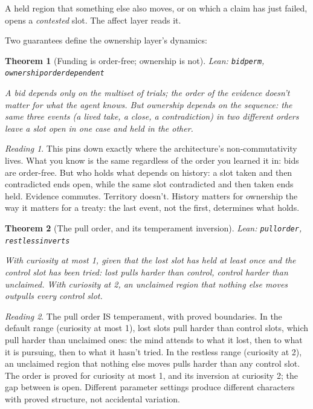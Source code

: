\documentclass[11pt]{article}
\newcommand{\leanus}{\textunderscore\allowbreak}
\newcommand{\lean}[1]{{\let\_\leanus\texttt{#1}}}
\newtheorem{theorem}{Theorem}[section]
\theoremstyle{remark}
\newtheorem*{reading}{Reading}
\begin{document}
A held region that something else also moves, or on which a claim has just failed, opens a
\emph{contested} slot. The affect layer reads it.

Two guarantees define the ownership layer's dynamics:

\begin{theorem}[Funding is order-free; ownership is not]
{\small\sloppy Lean: \lean{bid\_perm}, \lean{ownership\_order\_dependent}\par}
A bid depends only on the multiset of trials; the order of the evidence doesn't matter
for what the agent knows. But ownership depends on the sequence: the same three events
(a lived take, a close, a contradiction) in two different orders leave a slot open in one
case and held in the other.
\end{theorem}

\begin{reading}
This pins down exactly where the architecture's non-commutativity lives. What you know is
the same regardless of the order you learned it in: bids are order-free. But who holds
what depends on history: a slot taken and then contradicted ends open, while the same slot
contradicted and then taken ends held. Evidence commutes. Territory doesn't. History
matters for ownership the way it matters for a treaty: the last event, not the first,
determines what holds.
\end{reading}

\begin{theorem}[The pull order, and its temperament inversion]
{\small\sloppy Lean: \lean{pull\_order}, \lean{restless\_inverts}\par}
With curiosity at most 1, given that the lost slot has held at least once and the control
slot has been tried: lost pulls harder than control, control harder than unclaimed. With
curiosity at 2, an unclaimed region that nothing else moves outpulls every control slot.
\end{theorem}

\begin{reading}
The pull order IS temperament, with proved boundaries. In the default range (curiosity at most 1), lost slots pull harder than control slots,
which pull harder than unclaimed ones: the mind attends to what it lost, then to what it
is pursuing, then to what it hasn't tried. In the restless range (curiosity at 2), an
unclaimed region that nothing else moves pulls harder than any control slot. The order is proved for curiosity at most 1, and its
inversion at curiosity 2; the gap between is open. Different parameter settings produce
different characters with proved structure, not accidental variation.
\end{reading}
\end{document}
